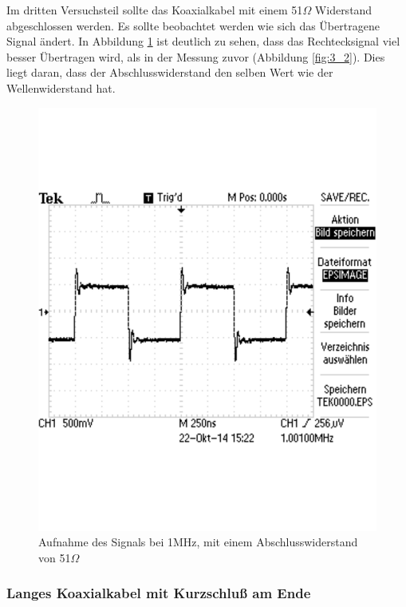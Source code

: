 \documentclass[12pt,a4paper]{article}
\begin{document}
Im dritten Versuchsteil sollte das Koaxialkabel mit einem 51$\Omega$ Widerstand abgeschlossen werden. Es sollte beobachtet werden wie sich das Übertragene Signal ändert. In Abbildung \ref{fig:3_3} ist deutlich zu sehen, dass das Rechtecksignal viel besser Übertragen wird, als in der Messung zuvor (Abbildung \ref{fig:3_2}). Dies liegt daran, dass der Abschlusswiderstand den selben Wert wie der Wellenwiderstand hat.

\begin{figure}[H] 
  \centering
    \includegraphics[scale = 0.5]{3_3.pdf}
  	\caption[Aufnahme des Signals bei 1MHz, mit einem Abschlusswiderstand von 51$\Omega$]{Aufnahme des Signals bei 1MHz, mit einem Abschlusswiderstand von 51$\Omega$}
  \label{fig:3_3}
\end{figure}

\subsubsection{Langes Koaxialkabel mit Kurzschluß am Ende}
\end{document}
